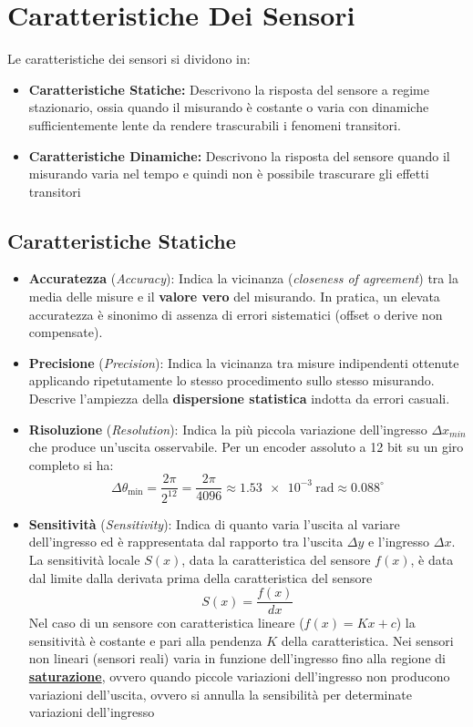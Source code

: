 ﻿\documentclass[11pt, a4paper]{article}
\begin{document}
\section{Caratteristiche Dei Sensori}

Le caratteristiche dei sensori si dividono in:

\begin{itemize}
    \item \textbf{Caratteristiche Statiche:} Descrivono la risposta del sensore a regime stazionario, ossia quando il misurando è costante o varia con dinamiche sufficientemente lente da rendere trascurabili i fenomeni transitori.
    \item \textbf{Caratteristiche Dinamiche:} Descrivono la risposta del sensore quando il misurando varia nel tempo e quindi non è possibile trascurare gli effetti transitori
\end{itemize}

\subsection{Caratteristiche Statiche}
\begin{itemize}
    \item \textbf{Accuratezza} (\textit{Accuracy}): Indica la vicinanza (\textit{closeness of agreement}) tra la media delle misure e il \textbf{valore vero} del misurando. In pratica, un elevata accuratezza è sinonimo di assenza di errori sistematici (offset o derive non compensate).
    \item \textbf{Precisione} (\textit{Precision}): Indica la vicinanza tra misure indipendenti ottenute applicando ripetutamente lo stesso procedimento sullo stesso misurando. Descrive l'ampiezza della \textbf{dispersione statistica} indotta da errori casuali.
    \item \textbf{Risoluzione} (\textit{Resolution}): Indica la più piccola variazione dell'ingresso $\Delta x_{min}$ che produce un'uscita osservabile. Per un encoder assoluto a 12 bit su un giro completo si ha:
    \[
        \Delta \theta_{\min} = \frac{2\pi}{2^{12}} = \frac{2\pi}{4096} \approx \SI{1.53e-3}{\radian} \approx 0.088^{\circ}
    \]
    \item \textbf{Sensitività} (\textit{Sensitivity}): Indica di quanto varia l'uscita al variare dell'ingresso ed è rappresentata dal rapporto tra l'uscita $\Delta y$ e l'ingresso $\Delta x$. La sensitività locale $S(x)$, data la caratteristica del sensore $f(x)$, è data dal limite dalla derivata prima della caratteristica del sensore
    \[
        S(x) = \frac{f(x)}{dx}
    \]
    Nel caso di un sensore con caratteristica lineare ($f(x) = Kx + c$) la sensitività è costante e pari alla pendenza $K$ della caratteristica. Nei sensori non lineari (sensori reali) varia in funzione dell'ingresso fino alla regione di \textbf{\underline{saturazione}}, ovvero quando piccole variazioni dell'ingresso non producono variazioni dell'uscita, ovvero si annulla la sensibilità per determinate variazioni dell'ingresso
\end{itemize}
\end{document}

